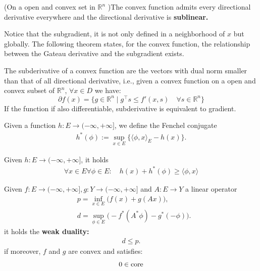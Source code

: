 \begin{corollary}
	(On a open and convex set in $\mathbb{R}^n$ )The convex function admits every directional derivative everywhere and the directional derivative is \textbf{sublinear. }
\end{corollary}

Notice that the subgradient, it is not only defined in a neighborhood of $x$ but globally. The following theorem states, for the convex function, the relationship between the Gateau derivative and the subgradient exists. 

\begin{theorem}
The subderivative of a convex function are the vectors with dual norm smaller than that of all directional derivative, i.e., given a convex function on a open and convex subset of $\mathbb{R}^n$, $\forall x \in D$ we have:
	\begin{equation}
		\partial f(x) = \{ g \in \mathbb{R}^n \mid g^\top s \leq f'(x,s)\quad \forall s \in \mathbb{R}^n\}
	\end{equation}
	If the function if also differentiable, subderivative is equivalent to gradient.
\end{theorem}


\begin{definition}
Given a function $h: E \rightarrow (-\infty, +\infty]$, we define the Fenchel conjugate 
\begin{align*}
	h^*(\phi):= \sup_{x \in E} \bigg\{ \langle \phi, x\rangle_E - h(x) \bigg\}. 
\end{align*}
\end{definition}



\begin{lemma}
	Given $h:E \rightarrow (-\infty, +\infty]$, it holds
	\begin{align*}
		\forall x \in E \forall \phi \in E: \quad  h(x) + h^*(\phi) \ge \langle \phi, x\rangle
	\end{align*}
\end{lemma}

\begin{theorem}
Given $f: E \rightarrow (-\infty, +\infty], g: Y \rightarrow (-\infty, + \infty]$ and $A: E \rightarrow Y$ a linear operator
\begin{align*}
	& p = \inf_{x \in E} \bigg( f(x) + g(A x) \bigg), \\
	& d = \sup_{\phi \in E} \bigg(-f^*(A^* \phi ) - g^*(- \phi) \bigg). 
\end{align*}
it holds the \textbf{weak duality:}
\begin{align*}
	d \le p.
\end{align*}
if moreover, $f$ and $g$ are convex and satisfies: 
$$
0 \in \operatorname*{core}
$$
\end{theorem}


